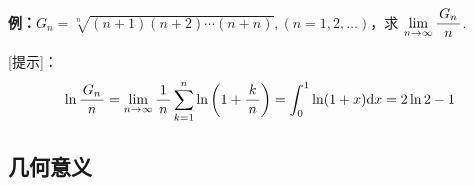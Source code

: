 {\bf 例：}$G_n=\sqrt[n]{(n+1)(n+2)\cdots(n+n)},(n=1,2,\ldots)$，求
$\limn\df{G_n}n$.

[提示]：
$$\ln\df{G_n}n=\limn\df1n\sum\limits_{k=1}^n\ln\left(1+\df kn\right)
=\dint_0^1\ln(1+x)\d x=2\ln2-1$$

\subsection{几何意义}

\begin{center}

\end{center}
